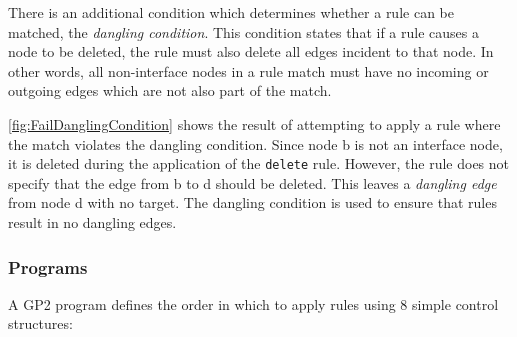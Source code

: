 \documentclass[authoryearcitations]{UoYCSproject}
\begin{document}
There is an additional condition which determines whether a rule can be matched, the
\emph{dangling condition}. This condition states that if a rule causes a node to be
deleted, the rule must also delete all edges incident to that node. In
other words, all non-interface nodes in a rule match must have no incoming or outgoing
edges which are not also part of the match.

\autoref{fig:FailDanglingCondition} shows the result of attempting to apply a rule
where the match violates the dangling condition. Since node b is not an interface
node, it is deleted during the application of the \texttt{delete} rule. However, the
rule does not specify that the edge from b to d should be deleted. This leaves a
\emph{dangling edge} from node d with no target. The dangling condition is used to
ensure that rules result in no dangling edges.


\subsubsection{Programs}
\label{sec:Programs}

A GP2 program defines the order in which to apply rules using 8 simple control
structures:
\end{document}
